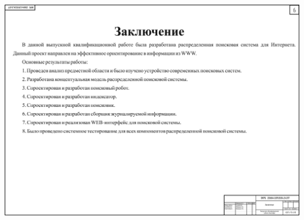 \begin{landscape}
\begin{плакат}
    \includegraphics[width=0.82\linewidth]{posters/p6im.png}
    \label{p6im:image}      
\end{плакат}

\end{landscape}